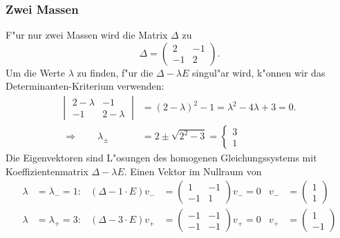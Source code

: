 \subsubsection{Zwei Massen}
F"ur nur zwei Massen wird die Matrix $\Delta$ zu
\[
\Delta=\begin{pmatrix}
2&-1\\
-1&2
\end{pmatrix}.
\]
Um die Werte $\lambda$ zu finden, f"ur die $\Delta-\lambda E$ singul"ar
wird, k"onnen wir das Determinanten-Kriterium verwenden:
\begin{align*}
\left|\;\begin{matrix}
2-\lambda&-1\\-1&2-\lambda
\end{matrix}\;\right|
&=(2-\lambda)^2-1=\lambda^2 -4\lambda+3=0.
\\
\Rightarrow\qquad
\lambda_{\pm}&=2\pm\sqrt{2^2-3}=\begin{cases}3\\1\end{cases}
\end{align*}
Die Eigenvektoren sind L"osungen des homogenen Gleichungssystems mit
Koeffizientenmatrix $\Delta-\lambda E$.
Einen Vektor im Nullraum
von
\begin{align*}
\lambda&=\lambda_-=1:&
(\Delta -1\cdot E)v_-&=
\begin{pmatrix}
1&-1\\-1&1
\end{pmatrix}v_-=0
&
v_-&=\begin{pmatrix}1\\1\end{pmatrix}
\\
\lambda&=\lambda_+=3:&
(\Delta -3\cdot E)v_+&=
\begin{pmatrix}
-1&-1\\-1&-1
\end{pmatrix}v_+=0
&
v_+&=\begin{pmatrix}1\\-1\end{pmatrix}
\end{align*}
